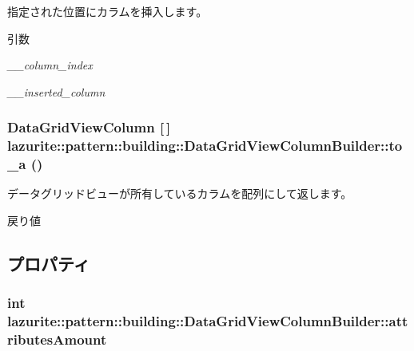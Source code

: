 指定された位置にカラムを挿入します。 
\begin{DoxyParams}{引数}
\item[{\em \_\-\_\-column\_\-index}]\item[{\em \_\-\_\-inserted\_\-column}]\end{DoxyParams}
\hypertarget{classlazurite_1_1pattern_1_1building_1_1_data_grid_view_column_builder_a11944b75c1f70aa64c630bc3e7121af4}{
\subsubsection[{to\_\-a}]{\setlength{\rightskip}{0pt plus 5cm}DataGridViewColumn \mbox{[}$\,$\mbox{]} lazurite::pattern::building::DataGridViewColumnBuilder::to\_\-a ()}}
\label{classlazurite_1_1pattern_1_1building_1_1_data_grid_view_column_builder_a11944b75c1f70aa64c630bc3e7121af4}


データグリッドビューが所有しているカラムを配列にして返します。 \begin{DoxyReturn}{戻り値}

\end{DoxyReturn}


\subsection{プロパティ}
\hypertarget{classlazurite_1_1pattern_1_1building_1_1_data_grid_view_column_builder_ad34b93f2213b632fec0bc01050b5a92f}{
\subsubsection[{attributesAmount}]{\setlength{\rightskip}{0pt plus 5cm}int lazurite::pattern::building::DataGridViewColumnBuilder::attributesAmount}}
\label{classlazurite_1_1pattern_1_1building_1_1_data_grid_view_column_builder_ad34b93f2213b632fec0bc01050b5a92f}


